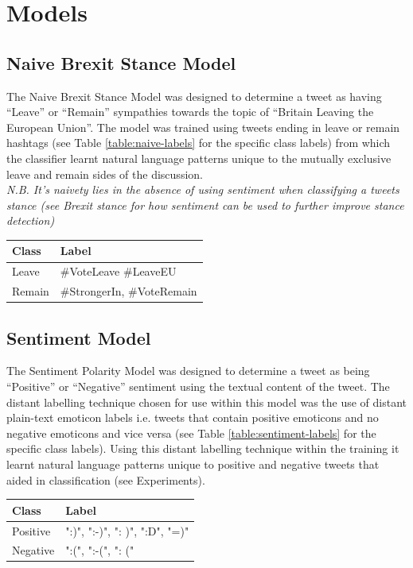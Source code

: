 \documentclass[11pt]{report}
\begin{document}
\section{Models}
\subsection{Naive Brexit Stance Model}
The Naive Brexit Stance Model was designed to determine a tweet as having ``Leave'' or ``Remain'' sympathies towards the topic of ``Britain Leaving the European Union''. The model
was trained using tweets ending in leave or remain hashtags (see Table \ref{table:naive-labels} for the specific class labels) from which the classifier learnt natural language patterns unique to the mutually
exclusive leave and remain sides of the discussion.
\\

\textit{N.B. It's naivety lies in the absence of using sentiment when classifying a tweets stance
(see Brexit stance for how sentiment can be used to further improve stance detection)}

\begin{center}
\begin{tabular}{ |p{1.5cm}||p{5cm}| }
\hline
 Class & Label\\
 \hline
 Leave &  \#VoteLeave \#LeaveEU\\
 \hline
 Remain &  \#StrongerIn, \#VoteRemain\\
 \hline
\end{tabular}
\label{table:naive-labels}
\end{center}

\subsection{Sentiment Model}
The Sentiment Polarity Model was designed to determine a tweet as being ``Positive'' or
``Negative'' sentiment using the textual content of the tweet. The distant labelling technique
chosen for use within this model was the use of distant plain-text emoticon labels i.e. tweets
that contain positive emoticons and no negative emoticons and vice versa (see Table  \ref{table:sentiment-labels} for the specific class labels). Using this distant labelling technique within the training it learnt natural language patterns unique to positive
and negative tweets that aided in classification (see Experiments).

\begin{center}
\begin{tabular}{ |p{1.5cm}||p{5cm}| }
\hline
 Class & Label\\
 \hline
 Positive & ":)", ":-)", ": )", ":D", "=)"\\
 \hline
 Negative &  ":(", ":-(", ": ("\\
 \hline
\end{tabular}
\label{table:sentiment-labels}
\end{center}
\end{document}

